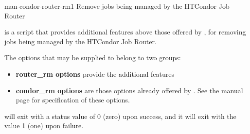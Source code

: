 \begin{ManPage}{}{man-condor-router-rm}{1}
{Remove jobs being managed by the HTCondor Job Router}

\Synopsis {}

\Description
{} is a script that provides additional features
above those offered by , 
for removing jobs being managed by the HTCondor Job Router. 

The options that may be supplied to  belong to two groups:
\begin{itemize}
	\item \textbf{router\_rm options} provide the additional features
	\item \textbf{condor\_rm options} are those options already offered
by .  See 
the  manual page for specification of these options. 
\end{itemize}

\begin{Options}
\end{Options}

\ExitStatus

 will exit with a status value of 0 (zero) upon success,
and it will exit with the value 1 (one) upon failure.

\end{ManPage}

